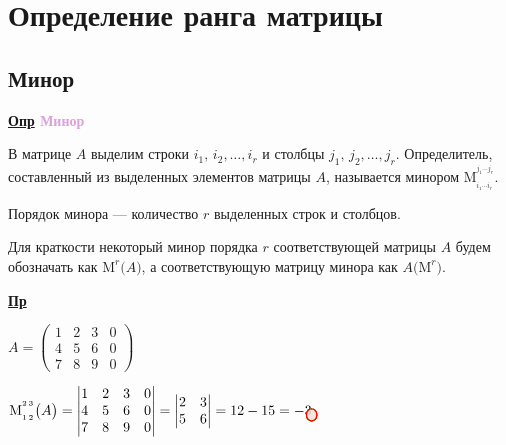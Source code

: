 \documentclass[12pt, a4paper]{report}
\newcommand{\tikzmarkemptyX}[2]{\tikz[overlay,remember picture,baseline=(#1.base)] \node [inner sep=1pt] (#1) {$#2$};}
\newcommand{\df}[1][]{\begin{flushleft}\textbf{\underline{Опр} \textcolor{Plum}{#1}}\end{flushleft}}
\newcommand{\ex}{\begin{flushleft}\textbf{\underline{Пр}}\end{flushleft}}
\newcommand{\inlineperm}[3][i]{{#1}_{#2}\dotsb{#1}_{#3}}
\begin{document}
	\section{Определение ранга матрицы}
	\subsection{Минор}
	\df[Минор]
	
	В матрице \(A\) выделим строки \(i_1,\,i_2,\dotsc,i_r\) и столбцы \(j_1,\,j_2,\dotsc,j_r\). Определитель, составленный из выделенных элементов матрицы \(A\), называется минором \(\mathrm{M}_{_{\inlineperm{1}{r}}}^{^{\inlineperm[j]{1}{r}}}\).
	
	Порядок минора --- количество \(r\) выделенных строк и столбцов. 
	
	Для краткости некоторый минор порядка \(r\) соответствующей матрицы \(A\) будем обозначать как \(\mathrm{M}^{r}\big(A\big)\), а соответствующую матрицу минора как \(A\big(\mathrm{M}^{r}\big)\).
	
	\ex
	
	\(A=\begin{pmatrix}1&2&3&0\\4&5&6&0\\7&8&9&0\end{pmatrix}\)
	
	\(\mathrm{M}_{_{1\,2}}^{^{2\,3}}\big(A\big)=\begin{vmatrix}\tikzmarkemptyX{L11}{1}&\tikzmarkemptyX{C11}{2}&\tikzmarkemptyX{C21}{3}&\tikzmarkemptyX{L12}{0}\\\tikzmarkemptyX{L21}{4}&5&6&\tikzmarkemptyX{L22}{0}\\7&\tikzmarkemptyX{C12}{8}&\tikzmarkemptyX{C22}{9}&0\end{vmatrix}=\begin{vmatrix}2&3\\5&6\end{vmatrix}=12-15=-3
	\begin{tikzpicture}[overlay, remember picture]
		\draw[rounded corners, green, thick, fill=green!15, fill opacity=0.4] (L11.north west) rectangle (L12.south east);
		\draw[rounded corners, green, thick, fill=green!15, fill opacity=0.4] (L21.north west) rectangle (L22.south east);
		\draw[rounded corners, red, thick, fill=red!15, fill opacity=0.4] (C11.north west) rectangle (C12.south east);
		\draw[rounded corners, red, thick, fill=red!15, fill opacity=0.4] (C21.north west) rectangle (C22.south east);
	\end{tikzpicture}\)
	
\end{document}
